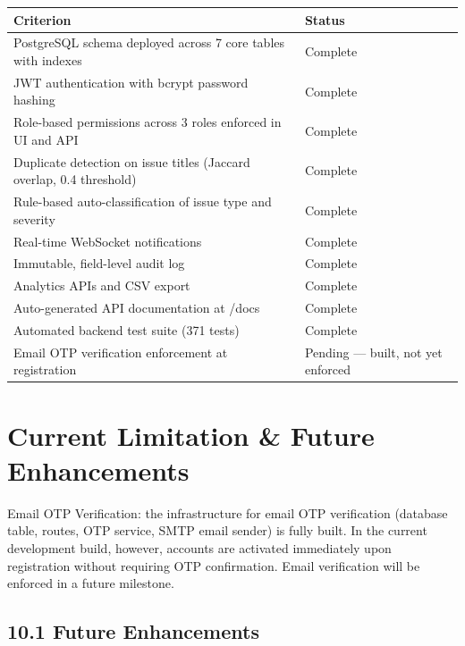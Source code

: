\documentclass[11pt]{article}
\newcommand{\tblhead}[1]{\rowcolor{accent}\color{white}\bfseries #1}
\begin{document}
\renewcommand{\arraystretch}{1.25}
\begin{tabular}{|L{11.8cm}|L{4cm}|}
\hline
\tblhead{Criterion} & \tblhead{Status} \\
\hline
PostgreSQL schema deployed across 7 core tables with indexes & Complete \\
\hline
JWT authentication with bcrypt password hashing & Complete \\
\hline
Role-based permissions across 3 roles enforced in UI and API & Complete \\
\hline
Duplicate detection on issue titles (Jaccard overlap, 0.4 threshold) & Complete \\
\hline
Rule-based auto-classification of issue type and severity & Complete \\
\hline
Real-time WebSocket notifications & Complete \\
\hline
Immutable, field-level audit log & Complete \\
\hline
Analytics APIs and CSV export & Complete \\
\hline
Auto-generated API documentation at /docs & Complete \\
\hline
Automated backend test suite (371 tests) & Complete \\
\hline
Email OTP verification enforcement at registration & Pending --- built, not yet enforced \\
\hline
\end{tabular}
\endrowcolors

\section{Current Limitation \& Future Enhancements}

Email OTP Verification: the infrastructure for email OTP verification (database table, routes, OTP service, SMTP email sender) is fully built. In the current development build, however, accounts are activated immediately upon registration without requiring OTP confirmation. Email verification will be enforced in a future milestone.

\subsection{10.1 Future Enhancements}
\end{document}
